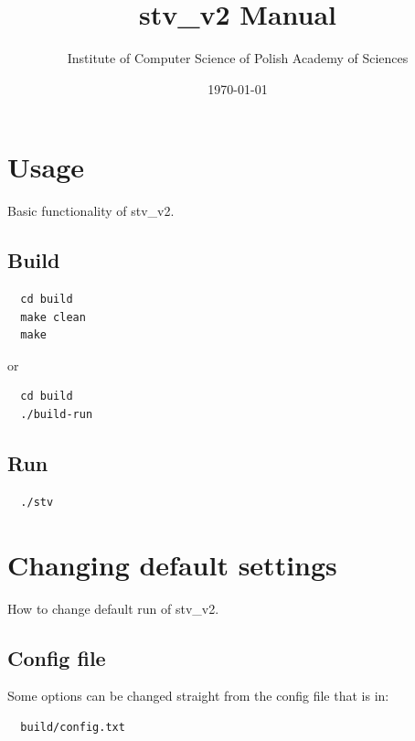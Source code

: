 \documentclass[12pt]{article}
\begin{document}
\title{stv\_v2 Manual}
\author{Institute of Computer Science of Polish Academy of Sciences}
\date{\today}
\maketitle
\thispagestyle{empty}
\vspace*{12cm}

\tableofcontents
{}
\hypersetup{pageanchor=true}

\newpage

\section{Usage}
Basic functionality of stv\_v2.

\subsection{Build}
\begin{lstlisting}
  cd build
  make clean
  make
\end{lstlisting}
or
\begin{lstlisting}
  cd build
  ./build-run
\end{lstlisting}

\subsection{Run}
\begin{lstlisting}
  ./stv
\end{lstlisting}

\section{Changing default settings}
How to change default run of stv\_v2.

\subsection{Config file}
Some options can be changed straight from the config file that is in:
\begin{lstlisting}
  build/config.txt
\end{lstlisting}

\bigbreak\bigbreak
\end{document}
